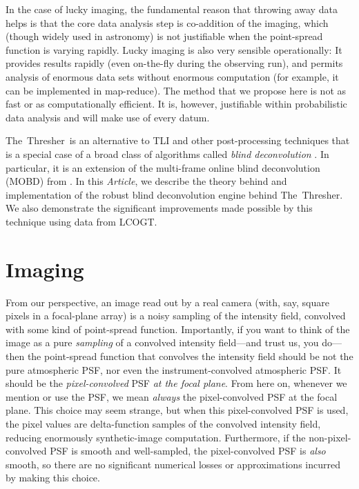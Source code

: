 \documentclass[12pt,preprint]{aastex}
\newcommand{\project}[1]{{\sffamily #1}}
\newcommand{\TheThresher}{\project{The~Thresher}}
\newcommand{\LCOGT}{\project{LCOGT}}
\newcommand{\documentname}{\textsl{Article}}
\newcommand{\sectlabel}[1]{\label{sect:#1}}
\begin{document}
In the case of lucky imaging, the fundamental reason that throwing
away data helps is that the core data analysis step is co-addition of
the imaging, which (though widely used in astronomy) is not
justifiable when the point-spread function is varying rapidly.  Lucky
imaging is also very sensible operationally: It provides results
rapidly (even on-the-fly during the observing run), and permits
analysis of enormous data sets without enormous computation (for
example, it can be implemented in map-reduce). The method that we
propose here is not as fast or as computationally efficient.  It is,
however, justifiable within probabilistic data analysis and will
make use of every datum.

\TheThresher\ is an alternative to TLI and other post-processing
techniques that is a special case of a broad class of algorithms
called \emph{blind deconvolution} \citep{ayers}. In particular, it
is an extension of the multi-frame online blind deconvolution (MOBD)
from \citet{hirsch}. In this \documentname, we describe the theory
behind and implementation of the robust blind deconvolution engine
behind \TheThresher. We also demonstrate the significant improvements
made possible by this technique using data from \LCOGT.

\section{Imaging} \sectlabel{imaging}

From our perspective, an image read out by a real camera (with, say,
square pixels in a focal-plane array) is a noisy sampling of the
intensity field, convolved with some kind of point-spread function.
Importantly, if you want to think of the image as a pure
\emph{sampling} of a convolved intensity field---and trust us, you
do---then the point-spread function that convolves the intensity field
should be not the pure atmospheric PSF, nor even the
instrument-convolved atmospheric PSF\@.  It should be the
\emph{pixel-convolved} PSF \emph{at the focal plane}.  From here on,
whenever we mention or use the PSF, we mean \emph{always} the
pixel-convolved PSF at the focal plane.  This choice may seem strange,
but when this pixel-convolved PSF is used, the pixel values are
delta-function samples of the convolved intensity field, reducing
enormously synthetic-image computation.  Furthermore, if the
non-pixel-convolved PSF is smooth and well-sampled, the
pixel-convolved PSF is \emph{also} smooth, so there are no significant
numerical losses or approximations incurred by making this choice.
\end{document}
